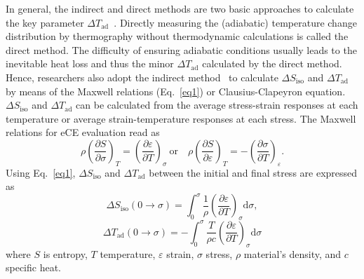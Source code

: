 \documentclass[reprint,3p,sort&compress,times,onecolumn]{elsarticle}
\begin{document}
In general, the indirect and direct methods are two basic approaches to calculate the key parameter $\Delta T_{\text{ad}}$~\cite{moya2020caloric}.
Directly measuring the (adiabatic) temperature change distribution by thermography without thermodynamic calculations is called the direct method.
The difficulty of ensuring adiabatic conditions usually leads to the inevitable heat loss and thus the minor $\Delta T_{\text{ad}}$ calculated by the direct method.
Hence, researchers also adopt the indirect method~\cite{yuan2019elastocaloric,chen2019giant,hou2018ultra} to calculate $\Delta S_{\text{iso}}$ and $\Delta T_{\text{ad}}$ by means of the Maxwell relations (Eq.~\ref{eq1}) or Clausius-Clapeyron equation. $\Delta S_{\text{iso}}$ and $\Delta T_{\text{ad}}$ can be calculated from the average stress-strain responses at each temperature or average strain-temperature responses at each stress. 
The Maxwell relations for eCE evaluation read as
\begin{equation}
  \rho  \left( \frac{\partial S}{\partial\sigma}\right)_T = \left( \frac{\partial \varepsilon}{\partial T}\right)_\sigma ~ \text{or} \quad \rho  \left( \frac{\partial S}{\partial\varepsilon}\right)_T = -\left( \frac{\partial \sigma}{\partial T}\right)_\varepsilon .\label{eq1}
\end{equation}
Using Eq.~\ref{eq1}, $\Delta S_{\text{iso}}$ and $\Delta T_{\text{ad}}$ between the initial and final stress are expressed as~\cite{bonnot2008elastocaloric}
\begin{equation}
    \Delta S_{\text{iso}} (0 \to \sigma)= \int_0^{\sigma} \frac{1}{\rho} \left(\frac{\partial \varepsilon}{\partial T}\right)_\sigma \text{d}\sigma , \label{eq26}
\end{equation}
\begin{equation}
    \Delta T_{\text{ad}} (0 \to \sigma)=- \int_0^\sigma \frac{T}{ \rho c} \left(\frac{\partial \varepsilon}{\partial T}\right)_\sigma \text{d}\sigma \label{eq27}
\end{equation}
where $S$ is entropy, $T$ temperature, $\varepsilon$  strain, $\sigma$ stress, $\rho$ material's density, and $c$ specific heat.
\end{document}
